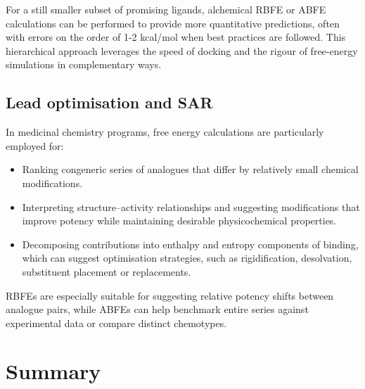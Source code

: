 \documentclass[12pt]{article}
\begin{document}
For a still smaller subset of promising ligands, alchemical RBFE or ABFE calculations can be performed to provide more quantitative predictions, often with errors on the order of 1-2 kcal/mol when best practices are followed\cite{CH10_wang2015accurate,CH10_aldeghi2018accurate}. This hierarchical approach leverages the speed of docking and the rigour of free-energy simulations in complementary ways. 

\subsection{Lead optimisation and SAR}

In medicinal chemistry programs, free energy calculations are particularly employed for:
\begin{itemize}
  \item Ranking congeneric series of analogues that differ by relatively small chemical modifications.
  \item Interpreting structure--activity relationships and suggesting modifications that improve potency while maintaining desirable physicochemical properties.
  \item Decomposing contributions into enthalpy and entropy components of binding, which can suggest optimisation strategies, such as rigidification, desolvation, substituent placement or replacements\cite{CH10_gilson1997calculation}. 
\end{itemize}
RBFEs are especially suitable for suggesting relative potency shifts between analogue pairs, while ABFEs can help benchmark entire series against experimental data or compare distinct chemotypes. 

\section{Summary}
\end{document}
